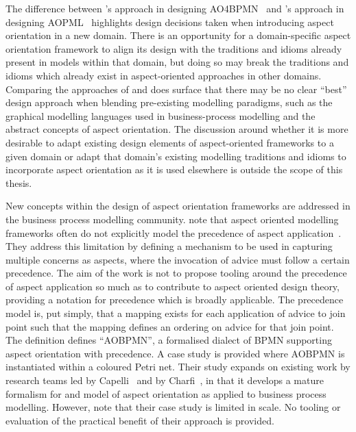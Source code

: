 The difference between \citeauthor{charfi2010AO4BPMN}'s approach in designing
AO4BPMN~\cite{charfi2010AO4BPMN} and \citeauthor{Cappelli_AOBPM}'s approach in
designing AOPML~\cite{Cappelli_AOBPM} highlights design decisions taken when
introducing aspect orientation in a new domain. There is an opportunity for a
domain-specific aspect orientation framework to align its design with the
traditions and idioms already present in models within that domain, but doing so
may break the traditions and idioms which already exist in aspect-oriented
approaches in other domains.  Comparing the approaches of
\citeauthor{charfi2010AO4BPMN} and \citeauthor{Cappelli_AOBPM} does surface that
there may be no clear ``best'' design approach when blending pre-existing
modelling paradigms, such as the graphical modelling languages used in
business-process modelling and the abstract concepts of aspect orientation. The
discussion around whether it is more desirable to adapt existing
design elements of aspect-oriented frameworks to a given domain or adapt that
domain's existing modelling traditions and idioms to incorporate aspect
orientation as it is used elsewhere is outside the scope of this thesis.

New concepts within the design of aspect orientation frameworks are addressed in
the business process modelling community.  note
that aspect oriented modelling frameworks often do not explicitly model the
precedence of aspect application~\cite{jalali2012aspect}. They address this
limitation by defining a mechanism to be used in capturing multiple concerns as
aspects, where the invocation of advice must follow a certain precedence. The
aim of the work is not to propose tooling around the precedence of aspect
application so much as to contribute to aspect oriented design theory, providing
a notation for precedence which is broadly applicable. The precedence model is,
put simply, that a mapping exists for each application of advice to join point
such that the mapping defines an ordering on advice for that join point. The
definition defines ``AOBPMN'', a formalised dialect of BPMN supporting aspect
orientation with precedence. A case study is provided where AOBPMN is
instantiated within a coloured Petri net. Their study expands on existing work
by research teams led by Capelli~\cite{Cappelli_AOBPM,da2020implementation} and
by Charfi~\cite{charfi2007ao4bpel}, in that it develops a mature formalism for
and model of aspect orientation as applied to business process modelling.
However, \citeauthor{j alali2012aspect} note that their case study is limited in
scale. No tooling or evaluation of the practical benefit of their approach is
provided.


